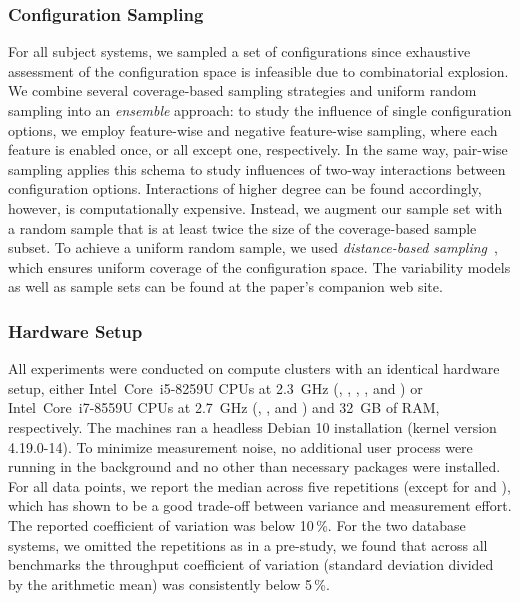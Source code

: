\subsubsection*{Configuration Sampling}
For all subject systems, we sampled a set of configurations since exhaustive assessment of the configuration space is infeasible due to combinatorial explosion. We combine several coverage-based sampling strategies and uniform random sampling into an \emph{ensemble} approach: to study the influence of single configuration options, we employ feature-wise and negative feature-wise sampling, where each feature is enabled once, or all except one, respectively. In the same way, pair-wise sampling applies this schema to study influences of two-way interactions between configuration options. Interactions of higher degree can be found accordingly, however, is computationally expensive. Instead, we augment our sample set with a random sample that is at least twice the size of the coverage-based sample subset. To achieve a uniform random sample, we used \emph{distance-based sampling}~\cite{kaltenecker_distance-based_2019}, which ensures uniform coverage of the configuration space. The variability models as well as sample sets can be found at the paper's companion web site.


\subsubsection*{Hardware Setup}
All experiments were conducted on compute clusters with an identical hardware setup, either Intel~Core~i5-8259U CPUs at 2.3~GHz (, , , , and ) or Intel~Core~i7-8559U CPUs at 2.7~GHz (, , and ) and 32~GB of RAM, respectively. The machines ran a headless Debian 10 installation (kernel version \mbox{4.19.0-14}). To minimize measurement noise, no additional user process were running in the background and no other than necessary packages were installed.
For all data points, we report the median across five repetitions (except for  and ), which has shown to be a good trade-off between variance and measurement effort. The reported coefficient of variation was below {\color{Red}10\,\%}. For the two database systems, we omitted the repetitions as in a pre-study, we found that across all benchmarks the throughput coefficient of variation (standard deviation divided by the arithmetic mean) was consistently below 5\,\%.

